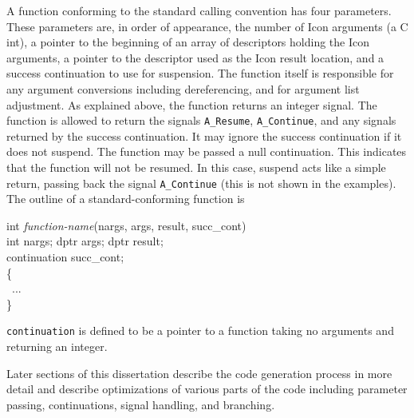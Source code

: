A function conforming to the standard calling convention has four
parameters. These parameters are, in order of appearance, the number
of Icon arguments (a C int), a pointer to the beginning of an array of
descriptors holding the Icon arguments, a pointer to the descriptor
used as the Icon result location, and a success continuation to use
for suspension. The function itself is responsible for any argument
conversions including dereferencing, and for argument list
adjustment. As explained above, the function returns an integer
signal. The function is allowed to return the signals
\texttt{A\_Resume}, \texttt{A\_Continue}, and any signals returned by
the success continuation. It may ignore the success continuation if it
does not suspend. The function may be passed a null continuation. This
indicates that the function will not be resumed. In this case, suspend
acts like a simple return, passing back the signal \texttt{A\_Continue}
(this is not shown in the examples). The outline of a
standard-conforming function is

\goodbreak
\begin{iconcode}
int \textit{function-name}(nargs, args, result, succ\_cont)\\
int nargs; dptr args; dptr result;\\
continuation succ\_cont;\\
\{\\
\>\ ...\\
\}\\
\end{iconcode}

\noindent
\texttt{continuation} is defined to be a pointer to a function taking
no arguments and returning an integer.

Later sections of this dissertation describe the code generation
process in more detail and describe optimizations of various parts of
the code including parameter passing, continuations, signal handling,
and branching.


\bigskip

\clearpage
\bigskip
